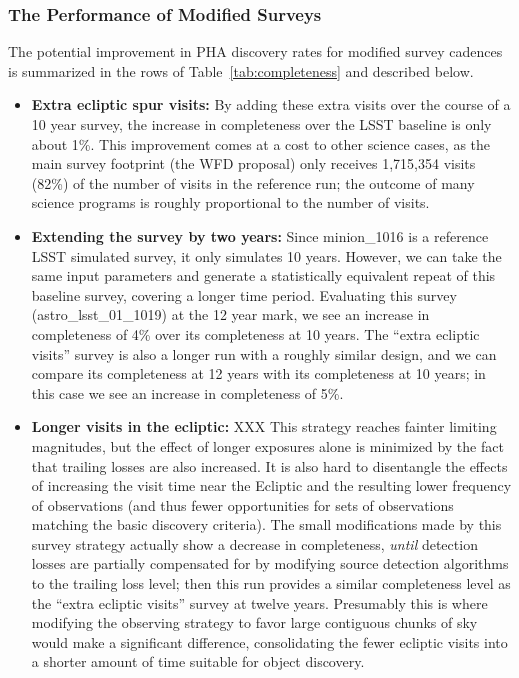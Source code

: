 \subsubsection{The Performance of Modified Surveys}

The potential improvement in PHA discovery rates for modified survey cadences is
summarized in the rows of Table~\ref{tab:completeness} and described below.

\begin{itemize}
\item \textbf{Extra ecliptic spur visits:} By adding these extra visits over the course of a 10 year survey, the increase in completeness over the LSST baseline is only about 1\%. This improvement comes at a cost to other science cases, as the main survey footprint (the WFD proposal) only receives 1,715,354 visits (82\%) of the number of visits in the reference run; the outcome of many science programs is roughly proportional to the number of visits.
\item \textbf{Extending the survey by two years:} Since minion\_1016 is a reference LSST simulated survey, it only simulates 10 years.
However, we can take the same input parameters and generate a statistically equivalent repeat of this baseline survey, covering a longer time period. Evaluating this survey (astro\_lsst\_01\_1019) at the 12 year mark, we see an increase in completeness of 4\% over its completeness at 10 years. The ``extra ecliptic visits'' survey is also a longer run with a roughly similar design, and we can compare its completeness at 12 years with its completeness at 10 years; in this case we see an increase in completeness of 5\%.
\item \textbf{Longer visits in the ecliptic:} XXX This strategy reaches fainter limiting magnitudes, but the effect of longer exposures alone is minimized by the fact that trailing losses are also increased. It is also hard to disentangle the effects of increasing the visit time near the Ecliptic and the resulting lower frequency of observations (and thus fewer opportunities for sets of observations matching the basic discovery criteria). The small modifications made by this survey strategy actually show a decrease in completeness, {\it until} detection losses are partially compensated for by modifying source detection algorithms to the trailing loss level; then this run provides a similar completeness level as the ``extra ecliptic visits'' survey at twelve years. Presumably this is where modifying the observing strategy to favor large contiguous chunks of sky would make a significant difference, consolidating the fewer ecliptic visits into a shorter amount of time suitable for object discovery.

\end{itemize}
